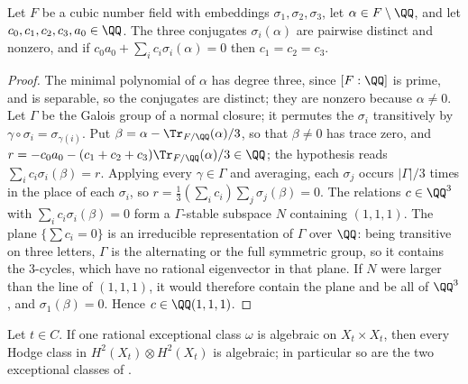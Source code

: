 \begin{lemma}\label{lem:conjugates}
Let $F$ be a cubic number field with embeddings $\sigma_{1},\sigma_{2},
\sigma_{3}$, let $\alpha\in F\setminus\QQ$, and let
$c_{0},c_{1},c_{2},c_{3},a_{0}\in\QQ$. The three conjugates
$\sigma_{i}(\alpha)$ are pairwise distinct and nonzero, and if
$c_{0}a_{0}+\sum_{i}c_{i}\sigma_{i}(\alpha)=0$ then $c_{1}=c_{2}=c_{3}$.
\end{lemma}

\begin{proof}
The minimal polynomial of $\alpha$ has degree three, since $[F:\QQ]$ is prime,
and is separable, so the conjugates are distinct; they are nonzero because
$\alpha\ne0$. Let $\Gamma$ be the Galois group of a normal closure; it
permutes the $\sigma_{i}$ transitively by $\gamma\circ\sigma_{i}=
\sigma_{\gamma(i)}$. Put $\beta=\alpha-\Tr_{F/\QQ}(\alpha)/3$, so that
$\beta\ne0$ has trace zero, and $r=-c_{0}a_{0}-(c_{1}+c_{2}+c_{3})
\Tr_{F/\QQ}(\alpha)/3\in\QQ$; the hypothesis reads $\sum_{i}c_{i}\sigma_{i}
(\beta)=r$. Applying every $\gamma\in\Gamma$ and averaging, each $\sigma_{j}$
occurs $|\Gamma|/3$ times in the place of each $\sigma_{i}$, so
$r=\frac13(\sum_{i}c_{i})\sum_{j}\sigma_{j}(\beta)=0$. The relations
$c\in\QQ^{3}$ with $\sum_{i}c_{i}\sigma_{i}(\beta)=0$ form a $\Gamma$-stable
subspace $N$ containing $(1,1,1)$. The plane $\{\sum c_{i}=0\}$ is an
irreducible representation of $\Gamma$ over $\QQ$: being transitive on three
letters, $\Gamma$ is the alternating or the full symmetric group, so it
contains the $3$-cycles, which have no rational eigenvector in that plane.
If $N$ were larger than the line of $(1,1,1)$, it would therefore contain the
plane and be all of $\QQ^{3}$, and $\sigma_{1}(\beta)=0$. Hence
$c\in\QQ(1,1,1)$.
\end{proof}

\begin{lemma}\label{lem:oneexceptional}
Let $t\in C$. If one rational exceptional class $\omega$ is algebraic on
$X_{t}\times X_{t}$, then every Hodge class in $H^{2}(X_{t})\otimes
H^{2}(X_{t})$ is algebraic; in particular so are the two exceptional classes
of .
\end{lemma}

